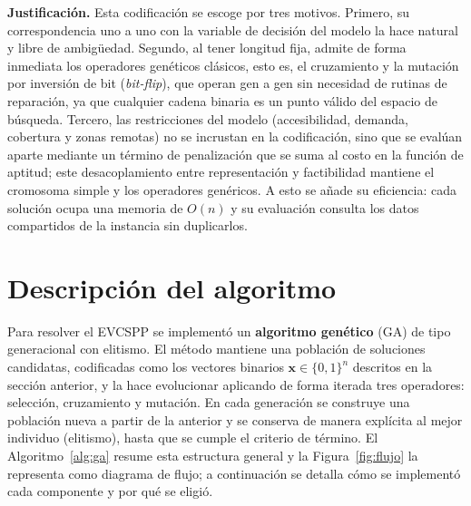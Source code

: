 \documentclass[letter, 10pt]{article}
\begin{document}
\textbf{Justificación.} Esta codificación se escoge por tres motivos. Primero, su
correspondencia uno a uno con la variable de decisión del modelo la hace natural y libre de
ambigüedad. Segundo, al tener longitud fija, admite de forma inmediata los operadores
genéticos clásicos, esto es, el cruzamiento y la mutación por inversión de bit
(\emph{bit-flip}), que operan gen a gen sin necesidad de rutinas de reparación, ya que
cualquier cadena binaria es un punto válido del espacio de búsqueda. Tercero, las restricciones del modelo (accesibilidad,
demanda, cobertura y zonas remotas) no se incrustan en la codificación, sino que se evalúan
aparte mediante un término de penalización que se suma al costo en la función de aptitud; este
desacoplamiento entre representación y factibilidad mantiene el cromosoma simple y los
operadores genéricos. A esto se añade su eficiencia: cada solución ocupa una memoria de
$O(n)$ y su evaluación consulta los datos compartidos de la instancia sin duplicarlos.

\section{Descripci\'on del algoritmo}

Para resolver el EVCSPP se implementó un \textbf{algoritmo genético} (GA) de tipo
generacional con elitismo. El método mantiene una población de soluciones candidatas,
codificadas como los vectores binarios $\mathbf{x} \in \{0,1\}^n$ descritos en la sección
anterior, y la hace evolucionar aplicando de forma iterada tres operadores: selección,
cruzamiento y mutación. En cada generación se construye una población nueva a partir de la
anterior y se conserva de manera explícita al mejor individuo (elitismo), hasta que se cumple
el criterio de término. El Algoritmo~\ref{alg:ga} resume esta estructura general y la
Figura~\ref{fig:flujo} la representa como diagrama de flujo; a continuación se detalla cómo se
implementó cada componente y por qué se eligió.
\end{document}
